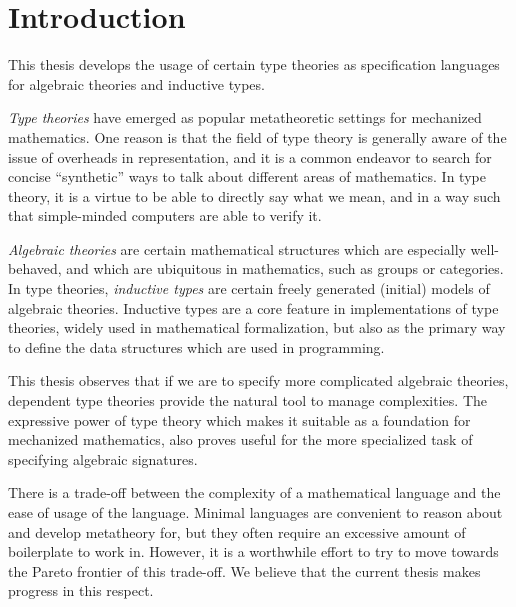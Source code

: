 \documentclass[12pt,a4paper,twoside,openany]{book}
\theoremstyle{remark}
\theoremstyle{definition}
\theoremstyle{theorem}
\begin{document}
\frontmatter
\tableofcontents{}

\mainmatter


\chapter{Introduction}

This thesis develops the usage of certain type theories as specification
languages for algebraic theories and inductive types.

\emph{Type theories} have emerged as popular metatheoretic settings for
mechanized mathematics. One reason is that the field of type theory is generally
aware of the issue of overheads in representation, and it is a common endeavor
to search for concise ``synthetic'' ways to talk about different areas of
mathematics. In type theory, it is a virtue to be able to directly say what we
mean, and in a way such that simple-minded computers are able to verify it.

\emph{Algebraic theories} are certain mathematical structures which are
especially well-behaved, and which are ubiquitous in mathematics, such as groups
or categories. In type theories, \emph{inductive types} are certain freely
generated (initial) models of algebraic theories. Inductive types are a core
feature in implementations of type theories, widely used in mathematical
formalization, but also as the primary way to define the data structures which
are used in programming.

This thesis observes that if we are to specify more complicated algebraic
theories, dependent type theories provide the natural tool to manage
complexities. The expressive power of type theory which makes it suitable as a
foundation for mechanized mathematics, also proves useful for the more
specialized task of specifying algebraic signatures.

There is a trade-off between the complexity of a mathematical language and the
ease of usage of the language. Minimal languages are convenient to reason about
and develop metatheory for, but they often require an excessive amount of
boilerplate to work in. However, it is a worthwhile effort to try to move
towards the Pareto frontier of this trade-off. We believe that the current
thesis makes progress in this respect.
\end{document}
